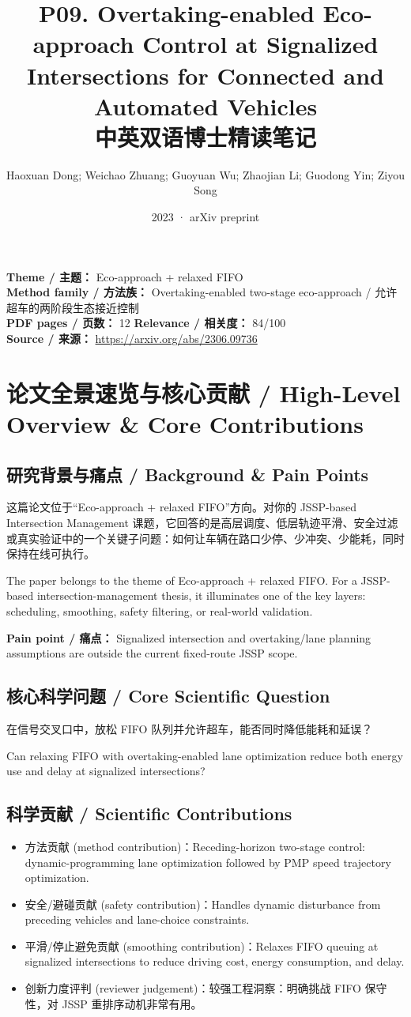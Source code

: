 \documentclass[UTF8,a4paper,11pt,fontset=fandol]{ctexart}
\title{P09. Overtaking-enabled Eco-approach Control at Signalized Intersections for Connected and Automated Vehicles\\中英双语博士精读笔记}
\author{Haoxuan Dong; Weichao Zhuang; Guoyuan Wu; Zhaojian Li; Guodong Yin; Ziyou Song}
\date{2023 · arXiv preprint}
\begin{document}
\maketitle

\noindent\textbf{Theme / 主题：} Eco-approach + relaxed FIFO\\
\textbf{Method family / 方法族：} Overtaking-enabled two-stage eco-approach / 允许超车的两阶段生态接近控制\\
\textbf{PDF pages / 页数：} 12 \quad
\textbf{Relevance / 相关度：} 84/100\\
\textbf{Source / 来源：} \url{https://arxiv.org/abs/2306.09736}

\section{论文全景速览与核心贡献 / High-Level Overview \& Core Contributions}
\subsection{研究背景与痛点 / Background \& Pain Points}
这篇论文位于“Eco-approach + relaxed FIFO”方向。对你的 JSSP-based Intersection Management 课题，它回答的是高层调度、低层轨迹平滑、安全过滤或真实验证中的一个关键子问题：如何让车辆在路口少停、少冲突、少能耗，同时保持在线可执行。

The paper belongs to the theme of Eco-approach + relaxed FIFO. For a JSSP-based intersection-management thesis, it illuminates one of the key layers: scheduling, smoothing, safety filtering, or real-world validation.

\textbf{Pain point / 痛点：} Signalized intersection and overtaking/lane planning assumptions are outside the current fixed-route JSSP scope.

\subsection{核心科学问题 / Core Scientific Question}
在信号交叉口中，放松 FIFO 队列并允许超车，能否同时降低能耗和延误？

Can relaxing FIFO with overtaking-enabled lane optimization reduce both energy use and delay at signalized intersections?

\subsection{科学贡献 / Scientific Contributions}
\begin{itemize}
\item 方法贡献 (method contribution)：Receding-horizon two-stage control: dynamic-programming lane optimization followed by PMP speed trajectory optimization.
\item 安全/避碰贡献 (safety contribution)：Handles dynamic disturbance from preceding vehicles and lane-choice constraints.
\item 平滑/停止避免贡献 (smoothing contribution)：Relaxes FIFO queuing at signalized intersections to reduce driving cost, energy consumption, and delay.
\item 创新力度评判 (reviewer judgement)：较强工程洞察：明确挑战 FIFO 保守性，对 JSSP 重排序动机非常有用。
\end{itemize}
\end{document}
